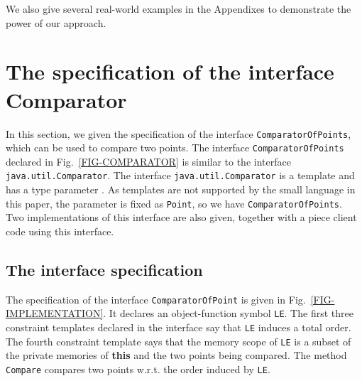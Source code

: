 \documentclass[fleqn]{llncs}
\begin{document}
We also give several real-world examples in the Appendixes to demonstrate the power of our approach.



\newpage
\appendix



\section{The specification of the interface Comparator}
In this section, we given the specification of the interface \texttt{ComparatorOfPoints}, which can be used to compare two points.
The interface \texttt{ComparatorOfPoints} declared in Fig.~\ref{FIG-COMPARATOR}  is similar to the interface
\texttt{java.util.Comparator}. The interface \texttt{java.util.Comparator} is a template and has a type parameter .
As templates are not supported by the small language in this paper,  the parameter  is fixed as \texttt{Point}, so we have \texttt{ComparatorOfPoints}.
Two implementations of this interface are also given, together with a piece client code using this interface.

\subsection{The interface specification}
The specification of the interface \texttt{ComparatorOfPoint} is given in Fig.~\ref{FIG-IMPLEMENTATION}.
It declares an object-function symbol \texttt{LE}. The first three constraint templates declared in the interface say that
\texttt{LE} induces a total order. The fourth constraint template says that
the memory scope of \texttt{LE} is a subset of the private memories of \textbf{this} and the two points being compared.
The method \texttt{Compare} compares two points w.r.t. the order induced by \texttt{LE}.
\end{document}
